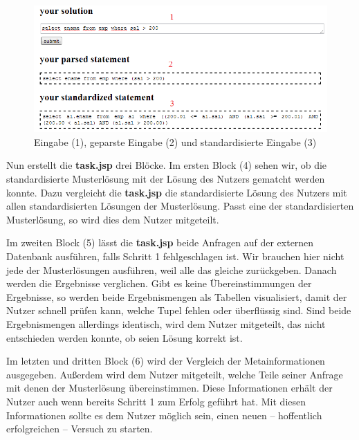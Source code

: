 \begin{figure}[H]
\centering
\includegraphics[scale=0.6]{Bilder/screen_prog1}
\caption{Eingabe (1), geparste Eingabe (2) und standardisierte Eingabe (3)}
\label{fig:screen_prog1}
\end{figure}

Nun erstellt die \textbf{task.jsp} drei Blöcke. Im ersten Block (4) sehen wir, ob die standardisierte Musterlösung mit der Lösung des Nutzers gematcht werden konnte. Dazu vergleicht die \textbf{task.jsp} die standardisierte Lösung des Nutzers mit allen standardisierten Lösungen der Musterlösung. Passt eine der standardisierten Musterlösung, so wird dies dem Nutzer mitgeteilt. 

Im zweiten Block (5) lässt die \textbf{task.jsp} beide Anfragen auf der externen Datenbank ausführen, falls Schritt 1 fehlgeschlagen ist. Wir brauchen hier nicht jede der Musterlösungen ausführen, weil alle das gleiche zurückgeben. Danach werden die Ergebnisse verglichen. Gibt es keine Übereinstimmungen der Ergebnisse, so werden beide Ergebnismengen als Tabellen visualisiert, damit der Nutzer schnell prüfen kann, welche Tupel fehlen oder überflüssig sind. Sind beide Ergebnismengen allerdings identisch, wird dem Nutzer mitgeteilt, das nicht entschieden werden konnte, ob seien Lösung korrekt ist.

Im letzten und dritten Block (6) wird der Vergleich der Metainformationen ausgegeben. Außerdem wird dem Nutzer mitgeteilt, welche Teile seiner Anfrage mit denen der Musterlösung übereinstimmen. Diese Informationen erhält der Nutzer auch wenn bereits Schritt 1 zum Erfolg geführt hat. Mit diesen Informationen sollte es dem Nutzer möglich sein, einen neuen -- hoffentlich erfolgreichen -- Versuch zu starten.

